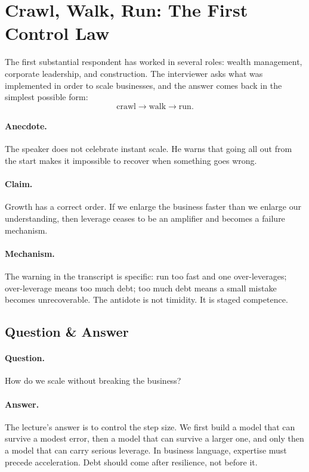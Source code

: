 \section{Crawl, Walk, Run: The First Control Law}

The first substantial respondent has worked in several roles: wealth management, corporate leadership, and construction. The interviewer asks what was implemented in order to scale businesses, and the answer comes back in the simplest possible form:
\begin{equation}
\text{crawl} \longrightarrow \text{walk} \longrightarrow \text{run}.
\end{equation}

\paragraph{Anecdote.}
The speaker does not celebrate instant scale. He warns that going all out from the start makes it impossible to recover when something goes wrong.

\paragraph{Claim.}
Growth has a correct order. If we enlarge the business faster than we enlarge our understanding, then leverage ceases to be an amplifier and becomes a failure mechanism.

\paragraph{Mechanism.}
The warning in the transcript is specific: run too fast and one over-leverages; over-leverage means too much debt; too much debt means a small mistake becomes unrecoverable. The antidote is not timidity. It is staged competence.

\subsection{Question \& Answer}

\paragraph{Question.}
How do we scale without breaking the business?

\paragraph{Answer.}
The lecture's answer is to control the step size. We first build a model that can survive a modest error, then a model that can survive a larger one, and only then a model that can carry serious leverage. In business language, expertise must precede acceleration. Debt should come after resilience, not before it.

